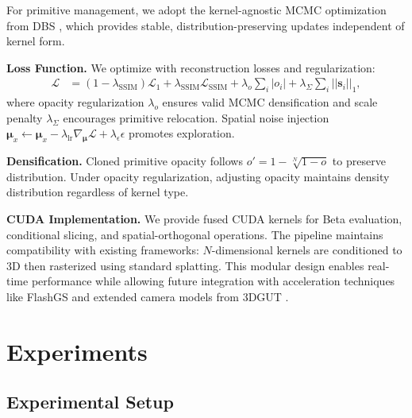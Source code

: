 \documentclass{article} %
\begin{document}
For primitive management, we adopt the kernel-agnostic MCMC optimization from DBS \citep{liu2025deformable}, which provides stable, distribution-preserving updates independent of kernel form.

\textbf{Loss Function.} We optimize with reconstruction losses and regularization:
\begin{align}
\mathcal{L} &= (1 - \lambda_{\text{SSIM}}) \mathcal{L}_1 + \lambda_{\text{SSIM}} \mathcal{L}_{\text{SSIM}} + \lambda_o \sum_i |o_i| + \lambda_\Sigma \sum_i ||\bm{s}_i||_1,
\end{align}
where opacity regularization $\lambda_o$ ensures valid MCMC densification and scale penalty $\lambda_\Sigma$ encourages primitive relocation. Spatial noise injection $\bm{\mu}_x \leftarrow \bm{\mu}_x - \lambda_{\text{lr}} \nabla_{\bm{\mu}} \mathcal{L} + \lambda_\epsilon \epsilon$ promotes exploration.

\textbf{Densification.} Cloned primitive opacity follows $o' = 1 - \sqrt[N]{1 - o}$ to preserve distribution. Under opacity regularization, adjusting opacity maintains density distribution regardless of kernel type.

\textbf{CUDA Implementation.} We provide fused CUDA kernels for Beta evaluation, conditional slicing, and spatial-orthogonal operations. The pipeline maintains compatibility with existing frameworks: $N$-dimensional kernels are conditioned to 3D then rasterized using standard splatting. This modular design enables real-time performance while allowing future integration with acceleration techniques like FlashGS \citep{feng2024flashgs} and extended camera models from 3DGUT \citep{wu20253dgut}.

\section{Experiments}
\subsection{Experimental Setup}
\end{document}
